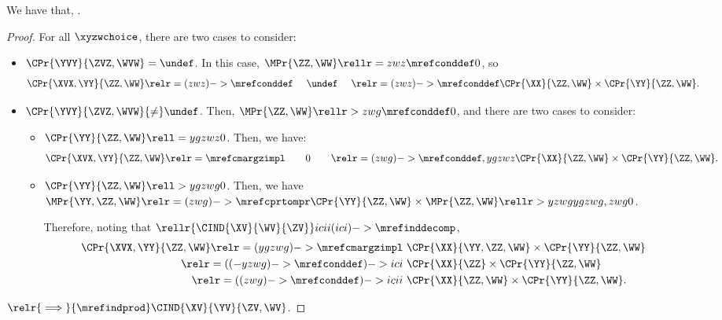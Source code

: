 \begin{proposition}
  We have that, \indwundefa.%
\end{proposition}

\begin{proof}
  For all $\xyzwchoice$, there are two cases to consider:
  \begin{itemize}
    \item {} $\CPr{\YVY}{\ZVZ, \WVW} = \undef$. In this case, $\MPr{\ZZ, \WW} \rellr = zwz {\mrefconddef} 0$, so
      \begin{align*}
        \CPr{\XVX, \YY}{\ZZ, \WW} \relr = {(zwz)->\mrefconddef} \ \ \ \ \undef\ \ \ \  
        \relr = {(zwz)->\mrefconddef} \CPr{\XX}{\ZZ, \WW}\times \CPr{\YY}{\ZZ, \WW}.
      \end{align*}
    \item {} $\CPr{\YVY}{\ZVZ, \WVW} {\ne} \undef$. Then, $\MPr{\ZZ, \WW} \rellr > zwg {\mrefconddef} 0$, and there are two cases to consider:
      \begin{itemize}
        \item {} $\CPr{\YY}{\ZZ, \WW} \rell = ygzwz 0$. Then, we have:
        \begin{align*}
          \CPr{\XVX, \YY}{\ZZ, \WW} \relr = {\mrefcmargzimpl} \ \ \ \ \ \ 0 \ \ \ \ \ \ 
          \relr = {(zwg)->\mrefconddef,ygzwz} \CPr{\XX}{\ZZ, \WW}\times \CPr{\YY}{\ZZ, \WW}.
        \end{align*}
      \item \nrp 6 $\CPr{\YY}{\ZZ, \WW} \rell > ygzwg 0$. 
        Then, we have $\MPr{\YY, \ZZ, \WW}  \relr = {(zwg)->\mrefcprtompr} \CPr{\YY}{\ZZ, \WW} \times \MPr{\ZZ, \WW} \rellr > yzwg {ygzwg,zwg} 0$.

        \nrp 7
        Therefore, noting that $\rellr {\CIND{\XV}{\WV}{\ZV}} icii {(ici)->\mrefinddecomp} $,
        \begin{align*}
          \CPr{\XVX, \YY}{\ZZ, \WW} \relr = {(ygzwg)->\mrefcmargzimpl} &\ \CPr{\XX}{\YY, \ZZ, \WW} \times \CPr{\YY}{\ZZ, \WW}\\
          \relr = {((-yzwg)->\mrefconddef)->ici} &\ \CPr{\XX}{\ZZ} \times \CPr{\YY}{\ZZ, \WW}\\
          \relr = {((zwg)->\mrefconddef)->icii} &\ \CPr{\XX}{\ZZ, \WW}\times \CPr{\YY}{\ZZ, \WW}.
        \end{align*}
      \end{itemize}
  \end{itemize}
  $\relr {\implies} {\mrefindprod} \CIND{\XV}{\YV}{\ZV, \WV}$.
\end{proof}

